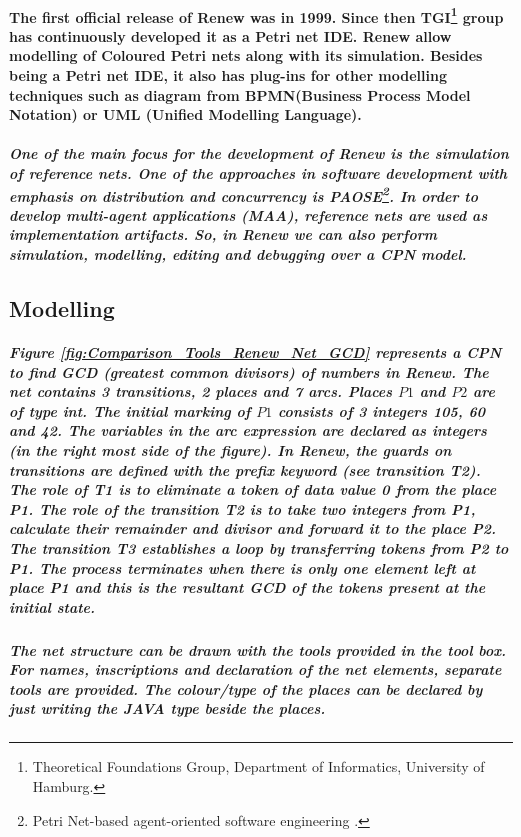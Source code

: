 \paragraph*{\textnormal{The first official release of Renew was in 1999. Since then TGI\footnote{Theoretical Foundations Group, Department of Informatics, University of Hamburg.} group has continuously developed it as a Petri net IDE. Renew allow modelling of Coloured Petri nets along with its simulation. Besides being a Petri net IDE, it also has plug-ins for other modelling techniques such as diagram from BPMN(Business Process Model Notation) or UML (Unified Modelling Language).}}
\subparagraph*{\textnormal{One of the main focus for the development of Renew is the simulation of reference nets. One of the approaches in software development with emphasis on distribution and concurrency is PAOSE\footnote{Petri Net-based agent-oriented software engineering \cite{DBLP:phd/de/Cabac2010}.}. In order to develop multi-agent applications (MAA), reference nets are used as implementation artifacts. So, in Renew we can also perform simulation, modelling, editing and debugging over a CPN model.}}

\subsection*{Modelling}

\subparagraph*{\textnormal{Figure \ref{fig:Comparison_Tools_Renew_Net_GCD} represents a CPN to find GCD (greatest common divisors) of numbers in Renew. The net contains 3 transitions, 2 places and 7 arcs. Places $P1$ and $P2$ are of type \textit{int}. The initial marking of $P1$ consists of 3 integers 105, 60 and 42. The variables in the arc expression are declared as integers (in the right most side of the figure). In Renew, the guards on transitions are defined with the prefix keyword (see transition \textit{T2}). The role of \textit{T1} is to eliminate a token of data value 0 from the place \textit{P1}. The role of the transition \textit{T2} is to take two integers from \textit{P1}, calculate their remainder and divisor and forward it to the place \textit{P2}. The transition \textit{T3} establishes a loop by transferring tokens from \textit{P2} to \textit{P1}. The process terminates when there is only one element left at place \textit{P1} and this is the resultant GCD of the tokens present at the initial state.}}

\subparagraph*{\textnormal{The net structure can be drawn with the tools provided in the tool box. For names, inscriptions and declaration of the net elements, separate tools are provided. The colour/type of the places can be declared by just writing the JAVA type beside the places.}}

